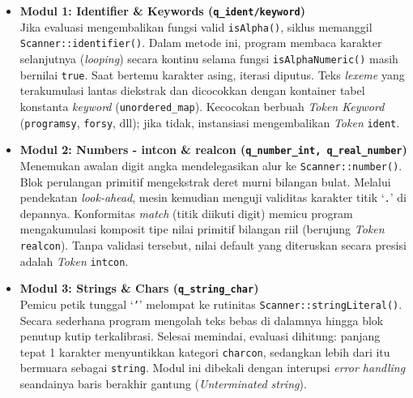 \documentclass[12pt,a4paper]{article}
\begin{document}
\begin{itemize}
    \item \textbf{Modul 1: Identifier \& Keywords (\texttt{q\_ident/keyword})}\\
    Jika evaluasi mengembalikan fungsi valid \texttt{isAlpha()}, siklus memanggil \texttt{Scanner::identifier()}. Dalam metode ini, program membaca karakter selanjutnya (\textit{looping}) secara kontinu selama fungsi \texttt{isAlphaNumeric()} masih bernilai \texttt{true}. Saat bertemu karakter asing, iterasi diputus. Teks \textit{lexeme} yang terakumulasi lantas diekstrak dan dicocokkan dengan kontainer tabel konstanta \textit{keyword} (\texttt{unordered\_map}). Kecocokan berbuah \textit{Token Keyword} (\texttt{programsy}, \texttt{forsy}, dll); jika tidak, instansiasi mengembalikan \textit{Token} \texttt{ident}.

    \item \textbf{Modul 2: Numbers - intcon \& realcon (\texttt{q\_number\_int, q\_real\_number})}\\
    Menemukan awalan digit angka mendelegasikan alur ke \texttt{Scanner::number()}. Blok perulangan primitif mengekstrak deret murni bilangan bulat. Melalui pendekatan \textit{look-ahead}, mesin kemudian menguji validitas karakter titik `\texttt{.}' di depannya. Konformitas \textit{match} (titik diikuti digit) memicu program mengakumulasi komposit tipe nilai primitif bilangan riil (berujung \textit{Token} \texttt{realcon}). Tanpa validasi tersebut, nilai default yang diteruskan secara presisi adalah \textit{Token} \texttt{intcon}.

    \item \textbf{Modul 3: Strings \& Chars (\texttt{q\_string\_char})}\\
    Pemicu petik tunggal `\texttt{'}' melompat ke rutinitas \texttt{Scanner::stringLiteral()}. Secara sederhana program mengolah teks bebas di dalamnya hingga blok penutup kutip terkalibrasi. Selesai memindai, evaluasi dihitung: panjang tepat 1 karakter menyuntikkan kategori \texttt{charcon}, sedangkan lebih dari itu bermuara sebagai \texttt{string}. Modul ini dibekali dengan interupsi \textit{error handling} seandainya baris berakhir gantung (\textit{Unterminated string}).


\end{itemize}
\end{document}
